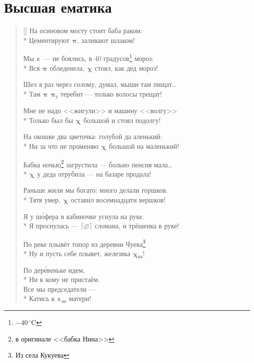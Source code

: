 \documentclass[a4paper,oneside,14pt]{scrbook}
\newcommand{\myPiz}[2]{$^{\text{#1}}${\large{$\boldsymbol{\pi}$}}$_{\text{#2}}$}
\newcommand{\myEbt}[2]{$^{\text{#1}}${\large{$\boldsymbol{\varepsilon}$}}$_{\text{#2}}$}
\newcommand{\myXyi}[2]{$^{\text{#1}}${\large{$\boldsymbol{\chi}$}}$_{\text{#2}}$}
\newcommand{\myCel}[2]{$^{\text{#1}}${\large{$\boldsymbol{\lceil\varnothing\rceil}$}}$_{\text{#2}}$}
\begin{document}
    \section{Высшая ематика}
    \settowidth{\versewidth}{Вся пизда обледенела, хуй стоял, как дед мороз}
    \begin{verse}[\versewidth]
        На осиновом мосту стоит баба раком:\\*
        Цементируют {\myPiz{}{}}, заливают шлаком!

        Мы {\myEbt{}{}} --- не боялись, в 40 градусов\footnote{$-40\,^{\circ}\mathrm{C}$} мороз:\\*
        Вся {\myPiz{}{}} обледенела, {\myXyi{}{}} стоял, как дед мороз!

        Шел я раз через солому, думал, мыши там пищат\ldots\\*
        Там {\myPiz{}{}} {\myPiz{}{у}} теребит --- только волосы трещат!

        Мне не надо <<жигули>> и машину <<волгу>>\\*
        Только был бы {\myXyi{}{}} большой и стоял подолгу!
        
        На окошке два цветочка: голубой да аленький:\\*
        Ни за что не променяю {\myXyi{}{}} большой на маленький!
        
        Бабка ночью\footnote{в оригинале <<бабка Нина>>} загрустила ---
            больно пенсия мала\ldots\\*
        {\myXyi{}{}} у деда отрубила --- на базаре продала!
        
        Раньше жили мы богато: много делали горшков.\\*
        Тятя умер, {\myXyi{}{}} оставил восемнадцати вершков!
        
        Я у ш\'{о}фера в кабиночке уснула на руке.\\*
        Я проснулась --- {\myCel{}{}} сломана, и трёшенка в руке!
        
        По реке плывёт топор из деревни Чуева\footnote{Из села Кукуева}\\*
        Ну и пусть себе плывет, железяка {\myXyi{}{ва}}!
        
        По дер\'{е}веньке идем,\\*
        Ни к кому не пристаём.\\
        Все мы председатели ---\\*
        Катись к {\myEbt{}{не}} матери!
        

\end{verse}
\end{document}
